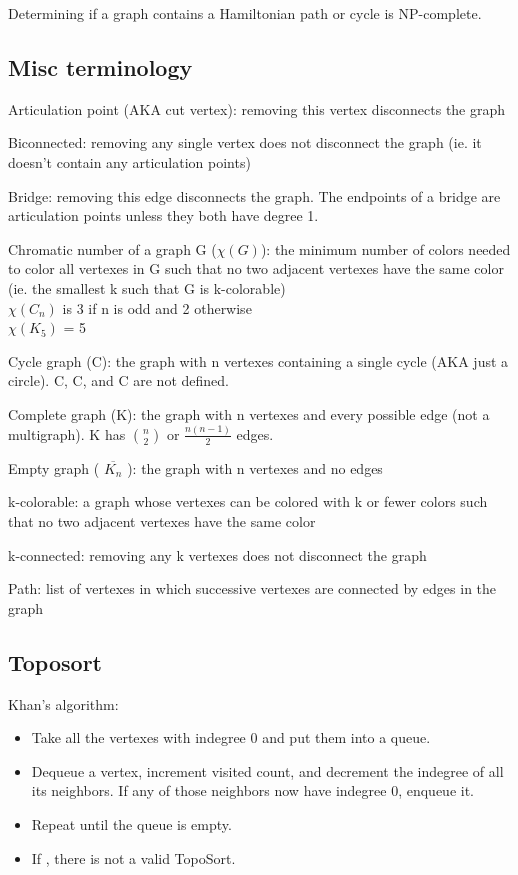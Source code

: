 Determining if a graph contains a Hamiltonian path or cycle is NP-complete.

\subsection*{Misc terminology}

Articulation point (AKA cut vertex): removing this vertex disconnects the graph

Biconnected: removing any single vertex does not disconnect the graph (ie. it doesn't contain any articulation points)

Bridge: removing this edge disconnects the graph. The endpoints of a bridge are articulation points unless they both have degree 1.

Chromatic number of a graph G ($\chi(G)$): the minimum number of colors needed to color all vertexes in G such that no two adjacent vertexes have the same color (ie. the smallest k such that G is k-colorable) \\
\indent $\chi(C_n)$ is 3 if n is odd and 2 otherwise \\
\indent $\chi(K_5)$ = 5

Cycle graph (C): the graph with n vertexes containing a single cycle (AKA just a circle). C, C, and C are not defined.

Complete graph (K): the graph with n vertexes and every possible edge (not a multigraph). K has $\binom{n}{2}$ or $\frac{n(n-1)}{2}$ edges.

Empty graph ( $\overline{K_n}$ ): the graph with n vertexes and no edges

k-colorable: a graph whose vertexes can be colored with k or fewer colors such that no two adjacent vertexes have the same color

k-connected: removing any k vertexes does not disconnect the graph

Path: list of vertexes in which successive vertexes are connected by edges in the graph

\subsection*{Toposort}

Khan's algorithm: 
\begin{itemize}
    \item Take all the vertexes with indegree 0 and put them into a queue.
    \item Dequeue a vertex, increment visited count, and decrement the indegree of all its neighbors. If any of those neighbors now have indegree 0, enqueue it.
    \item Repeat until the queue is empty.
    \item If , there is not a valid TopoSort.
\end{itemize}

